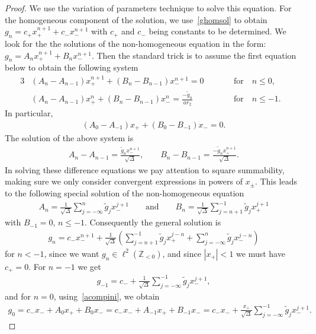 \documentclass[pdftex]{sigma}
\numberwithin{equation}{section}
\begin{document}
\begin{proof}
We use the variation of parameters technique to solve this equation.
For the homogeneous component of the solution, we use~\eqref{ghomsol} to obtain $g_n=c_+x_+^{n+1}+c_-x_-^{n+1}$ with
$c_+$ and $c_-$ being constants to be determined.
We look for the the solutions of the non-homogeneous equation in the form: $g_n=A_nx_+^{n+1}+B_nx_-^{n+1}$.
Then the standard trick is to assume the f\/irst equation below to obtain the following system
\begin{alignat*}{3}
&  (A_n -A_{n-1})x_+^{n+1}+(B_n-B_{n-1})x_-^{n+1}=0 \qquad &&\text{for}\quad  n\leq 0,&
\\
& (A_n -A_{n-1})x_+^n+(B_n-B_{n-1})x_-^n=\frac{-\tilde{g}_n}{ar_2} \qquad && \text{for}\quad  n\leq -1. &
\end{alignat*}
In particular,
\begin{gather}
\label{acompini}
(A_0 -A_{-1})x_++(B_0-B_{-1})x_-=0.
\end{gather}
The solution of the above system is
\begin{gather}
\label{acompgen}
A_n-A_{n-1}=\frac{\tilde{g}_nx_-^{n+1}}{\sqrt{\Delta}},
\qquad
B_n-B_{n-1}=\frac{-\tilde{g}_nx_+^{n+1}}{\sqrt{\Delta}}.
\end{gather}
In solving these dif\/ference equations we pay attention to square summability, making sure we only consider convergent
expressions in powers of $x_\pm$.
This leads to the following special solution of the non-homogeneous equation
\begin{gather*}
A_n=\frac{1}{\sqrt{\Delta}}\sum\limits_{j=-\infty}^n\tilde{g}_jx_-^{j+1}
\qquad
\text{and}
\qquad
B_n=\frac{1}{\sqrt{\Delta}}\sum\limits_{j=n+1}^{-1}\tilde{g}_jx_+^{j+1}
\end{gather*}
with $B_{-1}=0$, $n\leq -1$.
Consequently the general solution is
\begin{gather*}
g_n=c_-x_-^{n+1}+\frac{1}{\sqrt{\Delta}}\left(\sum\limits_{j=n+1}^{-1}\tilde{g}_jx_+^{j-n}+\sum\limits_{j=-\infty}^n\tilde{g}_jx_-^{j-n}\right)
\end{gather*}
for $n<-1$, since we want $g_n\in\ell^2({\mathbb Z}_{<0})$, and since $|x_+|<1$ we must have $c_+=0$.
For $n=-1$ we get
\begin{gather*}
g_{-1}=c_-+\frac{1}{\sqrt{\Delta}}\sum\limits_{j=-\infty}^{-1}\tilde{g}_jx_-^{j+1},
\end{gather*}
and for $n=0$, using~\eqref{acompini}, we obtain
\begin{gather*}
g_{0}=c_- x_-+A_0x_++B_0x_-= c_- x_-+A_{-1}x_++B_{-1}x_-=c_- x_-+\frac{x_+}{\sqrt{\Delta}}\sum\limits_{j=-\infty}^{-1}\tilde{g}_jx_-^{j+1}.
\end{gather*}


\end{proof}
\end{document}
